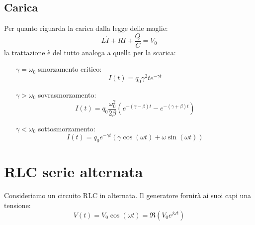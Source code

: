 \subsection{Carica}
Per quanto riguarda la carica dalla legge delle maglie:
\begin{equation}
L\dot I+RI+\frac{Q}{C}=V_0
\end{equation}
la trattazione è del tutto analoga a quella per la scarica:
\begin{itemize}
\item[$\gamma=\omega_0$] smorzamento critico:
\begin{equation}
I(t)=q_0\gamma^2te^{-\gamma t}
\end{equation}
\item[$\gamma>\omega_0$] sovrasmorzamento:
\begin{equation}
I(t)=q_0\frac{\omega_0^2}{2\beta}\left(e^{-(\gamma-\beta)t}-e^{-(\gamma+\beta)t}\right)
\end{equation}
\item[$\gamma<\omega_0$] sottosmorzamento:
\begin{equation}
I(t)=q_0e^{-\gamma t}\left(\gamma\cos(\omega t)+\omega\sin(\omega t)\right)
\end{equation}
\end{itemize}




\section{RLC serie alternata}
Consideriamo un circuito RLC in alternata. Il generatore fornirà ai suoi capi una tensione:
\begin{equation}
V(t)=V_0\cos\left(\omega t\right)=\Re(V_0 e^{j\omega t})
\end{equation}
